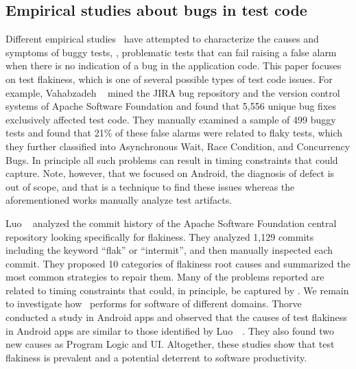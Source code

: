 \documentclass[conference]{IEEEtran}
\begin{document}
\subsection{Empirical studies about bugs in test code}
Different empirical studies~\cite{Luo:2014:EAF:2635868.2635920,Vahabzadeh2015,Waterloo:2015,tran2019test} have attempted to characterize  the causes and symptoms of buggy tests, \ie{}, problematic tests that can fail raising a false alarm when there is no indication of a bug in the application code. This paper focuses on test flakiness, which is one of several possible types of test code issues.
For example, Vahabzadeh \etal{}~\cite{Vahabzadeh2015} mined the JIRA bug repository and the version control systems of Apache Software Foundation and found that 5,556 unique bug fixes exclusively affected test code. They manually examined a sample of 499 buggy tests and found that 21\% of these false alarms were related to flaky tests, which they further classified into Asynchronous Wait, Race Condition, and Concurrency Bugs. In principle all such problems can result in timing constraints that \tname{} could capture. Note, however, that we focused on Android, the diagnosis of defect is out of scope, and that \tname{} is a technique to find these issues whereas the aforementioned works manually analyze test artifacts.

Luo \etal{}~\cite{Luo:2014:EAF:2635868.2635920} analyzed the commit history of the Apache Software Foundation central repository looking specifically for flakiness. They analyzed 1,129 commits including the keyword ``flak'' or ``intermit'', and then manually inspected each commit. They proposed 10 categories of flakiness root causes and summarized the most common strategies to repair them. Many of the problems reported are related to timing constraints that could, in principle, be captured by \tname{}. We remain to investigate how \tname\ performs for software of different domains. Thorve \etal~\cite{thorve2018empirical} conducted a study in Android apps and observed that the causes of test flakiness in Android apps are similar to those identified by Luo~\etal{}~\cite{Luo:2014:EAF:2635868.2635920}. They also found two new causes as Program Logic and UI. 
%
Altogether, these studies show that test flakiness is prevalent and a potential deterrent to software productivity.
\end{document}

